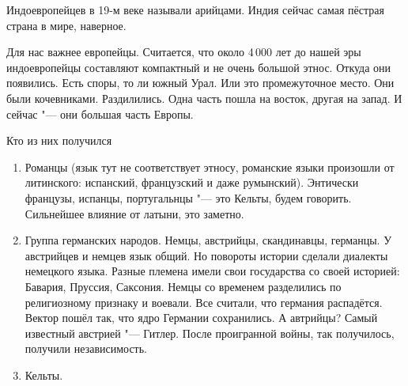 \begin{enumerate}
Индоевропейцев в 19-м веке называли арийцами. Индия сейчас самая пёстрая страна в мире, наверное.

Для нас важнее европейцы. Считается, что около 4\,000 лет до нашей эры индоевропейцы составляют компактный и не очень большой этнос. Откуда они появились. Есть споры, то ли южный Урал. Или это промежуточное место. Они были кочевниками. Раздилились. Одна часть пошла на восток, другая на запад. И сейчас "--- они большая часть Европы.

Кто из них получился
\begin{enumerate}
\item Романцы (язык тут не соответствует этносу, романские языки произошли от литинского: испанский, французский и даже румынский). Энтически французы, испанцы, португальнцы "--- это Кельты, будем говорить. Сильнейшее влияние от латыни, это заметно.
\item Группа германских народов. Немцы, австрийцы, скандинавцы, германцы. У австрийцев и немцев язык общий. Но повороты истории сделали диалекты немецкого языка. Разные племена имели свои государства со своей историей: Бавария, Пруссия, Саксония. Немцы со временем разделились по религиозному признаку и воевали. Все считали, что германия распадётся. Вектор пошёл так, что ядро Германии сохранились.
А автрийцы? Самый известный австрией "--- Гитлер. После проигранной войны, так получилось, получили независимость.

\item Кельты.
\end{enumerate}
\end{enumerate}
